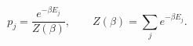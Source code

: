 \setcounter{equation}{48}
\begin{equation}
 p_j=\frac{e^{-\beta E_j}}{Z(\beta)},
 \qquad Z(\beta)=\sum_j e^{-\beta E_j}.
\end{equation}

